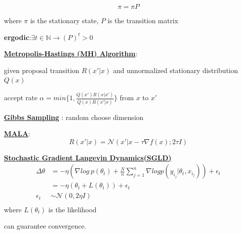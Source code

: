 \documentclass[landscape,a0paper,fontscale=0.285]{baposter} %
\begin{document}
\begin{poster}
{\colorbox[HTML]{CCFFFF}{}
\vspace{-0.3cm}
$$
\pi = \pi P
$$

where $\pi$ is the stationary state, $P$ is the transition matrix

\textbf{ergodic}:$\exists t\in \mathbb N \rightarrow (P)^t >0$
\vspace{0.2cm}

\underline{\textbf{Metropolis-Hastings (MH) Algorithm}}:

given proposal transition $R(x'|x)$ and unnormalized stationary distribution $Q(x)$

accept rate $\alpha = min\{1, \frac{Q(x')R(x|x')}{Q(x)R(x'|x)}\}$ from $x$ to $x'$
\vspace{0.2cm}

\underline{\textbf{Gibbs Sampling}} : random choose dimension

\underline{\textbf{MALA}}:
\vspace{-0.3cm}
$$
R(x'|x) = \mathcal N(x'|x-\tau \nabla f(x) ;2\tau I)
$$

\underline{\textbf{Stochastic Gradient Langevin Dynamics(SGLD)}}
\vspace{-0.3cm}
$$
\begin{aligned}
\Delta\theta &=  -\eta(\nabla log~p(\theta_t) + \frac{N}{n}\sum_{j=1}^n \nabla  log p(y_{i_{j}} | \theta_t, x_{i_j})) + \epsilon_t \\
& = -\eta(\theta_t + L(\theta_t)) + \epsilon_t\\
\epsilon_t &\sim \mathcal N(0, 2\eta I)\\
\end{aligned}
$$
where $L(\theta_t)$ is the likelihood

can guarantee convergence.




}






\end{poster}




\newpage
\end{document}
